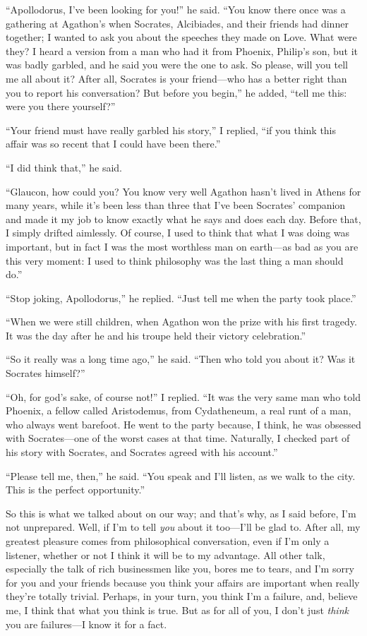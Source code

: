 “Apollodorus, I’ve been looking for you!” he said. “You know
there once was a gathering at Agathon’s when Socrates, Alcibiades, and
their friends had dinner together; I wanted to ask you about the
speeches they made on Love. What were they? I heard a version from a man
who had it from Phoenix, Philip’s son, but it was badly garbled, and he
said you were the one to ask. So please, will you tell me all about it?
After all, Socrates is your friend---who has a better right than you to
report his conversation? But before you begin,” he added, “tell me this:
were you there yourself?”

“Your friend must have really garbled his story,” I replied, “if
you think this affair was so recent that I could have been there.”

“I did think that,” he said.

“Glaucon, how could you? You know very well Agathon hasn’t lived in
Athens for many years, while it’s been less than three that I’ve been
Socrates’ companion and made it my job to know exactly what he says
and does each day. Before that, I simply drifted
aimlessly. Of course, I used to think that what I was doing was
important, but in fact I was the most worthless man on earth---as bad as
you are this very moment: I used to think philosophy was the last thing
a man should do.”

“Stop joking, Apollodorus,” he replied. “Just tell me when the party
took place.”

“When we were still children, when Agathon won the prize with his first
tragedy. It was the day after he and his troupe held their victory
celebration.”

“So it really was a long time ago,” he said. “Then who told you about
it? Was it Socrates himself?”

“Oh, for god’s sake, of course not!” I replied. “It was the very same
man who told Phoenix, a fellow called Aristodemus, from
Cydatheneum, a real runt of a man, who always went barefoot. He went to
the party because, I think, he was obsessed with Socrates---one of the
worst cases at that time. Naturally, I checked part of his story with
Socrates, and Socrates agreed with his account.”

“Please tell me, then,” he said. “You speak and I’ll listen, as we walk
to the city. This is the perfect opportunity.”

So this is what we talked about on our way; and that’s why, as I said
before, I’m not unprepared. Well, if I’m to tell {\em you} about
it too---I’ll be glad to. After all, my greatest pleasure comes from
philosophical conversation, even if I’m only a listener, whether or not
I think it will be to my advantage. All other talk, especially the talk
of rich businessmen like you, bores me to tears, and I’m sorry for you
and your friends because you think your affairs are important when
really they’re totally trivial. Perhaps, in your turn, you think
I’m a failure, and, believe me, I think that what you think is true. But
as for all of you, I don’t just {\em think} you are failures---I know it
for a fact.

